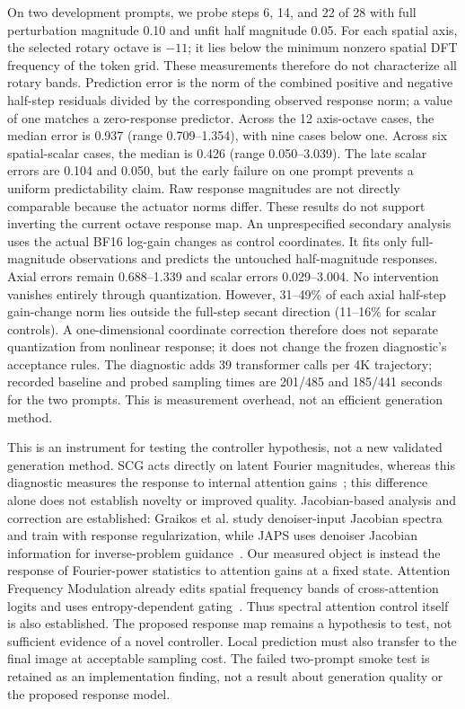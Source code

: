 On two development prompts, we probe steps 6, 14, and 22 of 28 with full
perturbation magnitude 0.10 and unfit half magnitude 0.05. For each spatial axis,
the selected rotary octave is $-11$; it lies below the minimum nonzero spatial
DFT frequency of the token grid. These measurements therefore do not characterize
all rotary bands. Prediction error is the norm of the combined positive and
negative half-step residuals divided by the corresponding observed response
norm; a value of one matches a zero-response predictor.
Across the 12 axis-octave cases, the median error is 0.937 (range 0.709--1.354),
with nine cases below one. Across six spatial-scalar cases, the median is 0.426
(range 0.050--3.039). The late scalar errors are 0.104 and 0.050, but the early
failure on one prompt prevents a uniform predictability claim. Raw response
magnitudes are not directly comparable because the actuator norms differ.
These results do not support inverting the current octave response map.
An unprespecified secondary analysis uses the actual BF16 log-gain changes as
control coordinates. It fits only full-magnitude observations and predicts the
untouched half-magnitude responses. Axial errors remain 0.688--1.339 and scalar
errors 0.029--3.004. No intervention vanishes entirely through quantization.
However, 31--49\% of each axial half-step gain-change norm lies outside the
full-step secant direction (11--16\% for scalar controls). A one-dimensional
coordinate correction therefore does not separate quantization from nonlinear
response; it does not change the frozen diagnostic's acceptance rules.
The diagnostic adds 39 transformer calls per 4K trajectory; recorded baseline
and probed sampling times are 201/485 and 185/441 seconds for the two prompts.
This is measurement overhead, not an efficient generation method.

This is an instrument for testing the controller
hypothesis, not a new validated generation method. SCG acts directly on latent
Fourier magnitudes, whereas this diagnostic measures the response to internal
attention gains~\citep{scg2026,sega2026}; this difference alone does not establish
novelty or improved quality.
Jacobian-based analysis and correction are established: Graikos et al. study
denoiser-input Jacobian spectra and train with response regularization, while
JAPS uses denoiser Jacobian information for inverse-problem
guidance~\citep{graikos2026jacobian,hen2026japs}. Our measured object is instead
the response of Fourier-power statistics to attention gains at a fixed state.
Attention Frequency Modulation already edits spatial frequency bands of
cross-attention logits and uses entropy-dependent gating~\citep{oh2026afm}.
Thus spectral attention control itself is also established.
The proposed response map remains a hypothesis to test, not sufficient evidence
of a novel controller. Local prediction must also transfer to the final image at acceptable
sampling cost. The failed two-prompt smoke test is retained as an implementation
finding, not a result about generation quality or the proposed response model.

